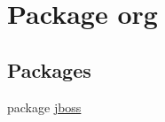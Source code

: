 \hypertarget{namespaceorg}{}\section{Package org}
\label{namespaceorg}
\subsection*{Packages}
\begin{DoxyCompactItemize}
\item 
package \hyperlink{namespaceorg_1_1jboss}{jboss}
\end{DoxyCompactItemize}
